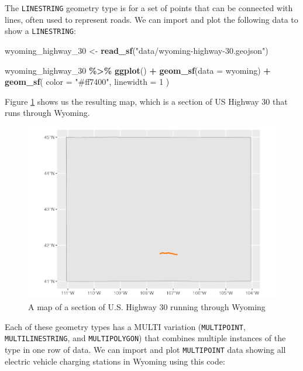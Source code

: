 \documentclass[
]{book}
\newenvironment{Shaded}{\begin{snugshade}}{\end{snugshade}}
\newcommand{\AttributeTok}[1]{\textcolor[rgb]{0.13,0.29,0.53}{#1}}
\newcommand{\DecValTok}[1]{\textcolor[rgb]{0.00,0.00,0.81}{#1}}
\newcommand{\FunctionTok}[1]{\textcolor[rgb]{0.13,0.29,0.53}{\textbf{#1}}}
\newcommand{\NormalTok}[1]{#1}
\newcommand{\OtherTok}[1]{\textcolor[rgb]{0.56,0.35,0.01}{#1}}
\newcommand{\SpecialCharTok}[1]{\textcolor[rgb]{0.81,0.36,0.00}{\textbf{#1}}}
\newcommand{\StringTok}[1]{\textcolor[rgb]{0.31,0.60,0.02}{#1}}
\begin{document}
The \texttt{LINESTRING} geometry type is for a set of points that can be connected with lines, often used to represent roads. We can import and plot the following data to show a \texttt{LINESTRING}:

\begin{Shaded}
\begin{Highlighting}[]
\NormalTok{wyoming\_highway\_30 }\OtherTok{\textless{}{-}} \FunctionTok{read\_sf}\NormalTok{(}\StringTok{"data/wyoming{-}highway{-}30.geojson"}\NormalTok{)}

\NormalTok{wyoming\_highway\_30 }\SpecialCharTok{\%\textgreater{}\%}
  \FunctionTok{ggplot}\NormalTok{() }\SpecialCharTok{+}
  \FunctionTok{geom\_sf}\NormalTok{(}\AttributeTok{data =}\NormalTok{ wyoming) }\SpecialCharTok{+}
  \FunctionTok{geom\_sf}\NormalTok{(}
    \AttributeTok{color =} \StringTok{"\#ff7400"}\NormalTok{,}
    \AttributeTok{linewidth =} \DecValTok{1}
\NormalTok{  )}
\end{Highlighting}
\end{Shaded}

Figure \ref{fig:wy-roads-map} shows us the resulting map, which is a section of US Highway 30 that runs through Wyoming.

\begin{figure}
\includegraphics[width=1\linewidth]{maps_files/figure-latex/wy-roads-map-1} \caption{A map of a section of U.S. Highway 30 running through Wyoming}\label{fig:wy-roads-map}
\end{figure}

Each of these geometry types has a MULTI variation (\texttt{MULTIPOINT}, \texttt{MULTILINESTRING}, and \texttt{MULTIPOLYGON}) that combines multiple instances of the type in one row of data. We can import and plot \texttt{MULTIPOINT} data showing all electric vehicle charging stations in Wyoming using this code:
\end{document}
